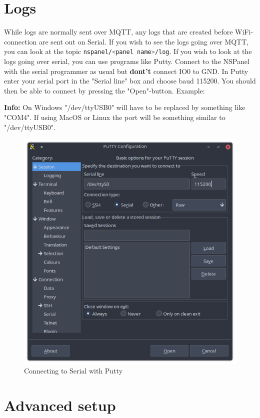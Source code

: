 \documentclass[10pt]{article}
\newcommand{\info}[1]{\begin{infoBox} \textbf{Info:} #1 \end{infoBox}}
\begin{document}
    \section{Logs}
    \label{sec:logs}
    While logs are normally sent over MQTT, any logs that are created before WiFi-connection are sent out on Serial. If you wish to see the logs going over MQTT, you can look at the topic \lstinline[language=bash]{nspanel/<panel name>/log}. If you wish to look at the logs going over serial, you can use programs like Putty. Connect to the NSPanel with the serial programmer as usual but \textbf{dont't} connect IO0 to GND. In Putty enter your serial port in the "Serial line" box and choose baud 115200. You should then be able to connect by pressing the "Open"-button. Example:
    \info{On Windows "/dev/ttyUSB0" will have to be replaced by something like "COM4". If using MacOS or Linux the port will be something similar to "/dev/ttyUSB0".}
    \begin{figure}[H]
    \centering
    \includegraphics[scale=0.5]{putty_serial.png}
    \caption{Connecting to Serial with Putty}%
    \end{figure}

    \clearpage
    \section{Advanced setup}
    \label{sec:advanced_setup}
\end{document}
